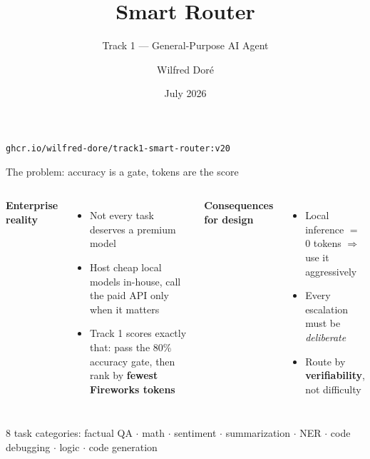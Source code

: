 \documentclass[aspectratio=169]{beamer}
\title{Smart Router}
\subtitle{Track 1 --- General-Purpose AI Agent}
\author{Wilfred Dor\'e}
\institute{AMD Developer Hackathon --- ACT II \\ Team Robot ROCm}
\date{July 2026}
\begin{document}
\begin{frame}
  \titlepage
  \begin{center}
    \texttt{ghcr.io/wilfred-dore/track1-smart-router:v20}
  \end{center}
\end{frame}

\begin{frame}{The problem: accuracy is a gate, tokens are the score}
  \begin{columns}[T]
      \textbf{Enterprise reality}
      \begin{itemize}
        \item Not every task deserves a premium model
        \item Host cheap local models in-house, call the paid API only when it matters
        \item Track 1 scores exactly that: pass the 80\% accuracy gate, then rank by \textbf{fewest Fireworks tokens}
      \end{itemize}
      \textbf{Consequences for design}
      \begin{itemize}
        \item Local inference $=$ 0 tokens $\Rightarrow$ use it aggressively
        \item Every escalation must be \emph{deliberate}
        \item Route by \textbf{verifiability}, not difficulty
      \end{itemize}
  \end{columns}
  \vspace{0.4cm}
  \centering
  \small 8 task categories: factual QA $\cdot$ math $\cdot$ sentiment $\cdot$ summarization $\cdot$ NER $\cdot$ code debugging $\cdot$ logic $\cdot$ code generation
\end{frame}
\end{document}
